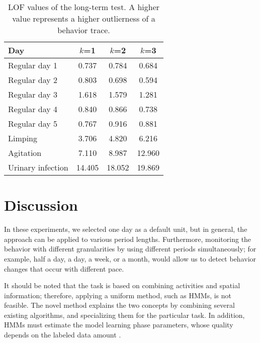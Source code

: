 \begin{table}[h!]
\centering
\caption{LOF values of the long-term test. A higher value represents a higher outlierness of a behavior trace.}
\begin{tabular}{lccc}
\toprule
Day & $k$=1	& $k$=2	& $k$=3 \\
\hline
Regular day 1 & 0.737 & 0.784 & 0.684	\\
Regular day 2 & 0.803 & 0.698 & 0.594	\\
Regular day 3 & 1.618 & 1.579 & 1.281	\\
Regular day 4 & 0.840 & 0.866 & 0.738	\\
Regular day 5 & 0.767 & 0.916 & 0.881	\\
\hline
Limping 		 & 3.706 & 4.820 & 6.216	\\
Agitation 	 & 7.110 & 8.987 & 12.960	\\
Urinary infection & 14.405 & 18.052 & 19.869	\\
\toprule
\end{tabular}
\label{tab:LOF-long}
\end{table}

\section{Discussion}
\label{sec:discussion}


In these experiments, we selected one day as a default unit, but in general, the approach can be applied to various period lengths. Furthermore, monitoring the behavior with different granularities by using different periods simultaneously; for example, half a day, a day, a week, or a month, would allow us to detect behavior changes that occur with different pace.

It should be noted that the task is based on combining activities and spatial information; therefore, applying a uniform method, such as HMMs, is not feasible. The novel method explains the two concepts by combining several existing algorithms, and specializing them for the particular task. In addition, HMMs must estimate the model learning phase parameters, whose quality depends on the labeled data amount \citep{Rabiner1989}. 

